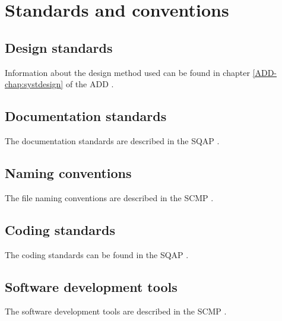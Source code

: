 \chapter{Standards and conventions}
\label{chap:impStandConv}

\section{Design standards}
Information about the design method used can be found in chapter \ref*{ADD-chap:systdesign} of the ADD \cite{add}.

\section{Documentation standards}
The documentation standards are described in the SQAP \cite{sqap}.

\section{Naming conventions}
The file naming conventions are described in the SCMP \cite{scmp}.

\section{Coding standards}
The coding standards can be found in the SQAP \cite{sqap}.

\section{Software development tools}
The software development tools are described in the SCMP \cite{scmp}.
